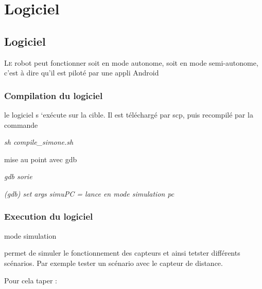 \newpage

\chapter{Logiciel}
\section{Logiciel}
\lettrine[lines=1]{L}e robot peut fonctionner soit en mode autonome, soit en mode semi-autonome, c'est à dire qu'il est piloté par une appli Android


\subsection{Compilation du logiciel}



le logiciel s ‘exécute sur la cible. Il est téléchargé par scp, puis recompilé par la commande

\textit{sh compile\_simone.sh}



mise au point avec gdb

\textit{gdb sorie}

\textit{(gdb) set args simuPC = lance en mode simulation pc}






\subsection{Execution du logiciel}





mode simulation





permet de simuler le fonctionnement des capteurs et ainsi tetster différents scénarios. Par exemple tester un scénario avec le capteur de distance.

Pour cela taper :




 